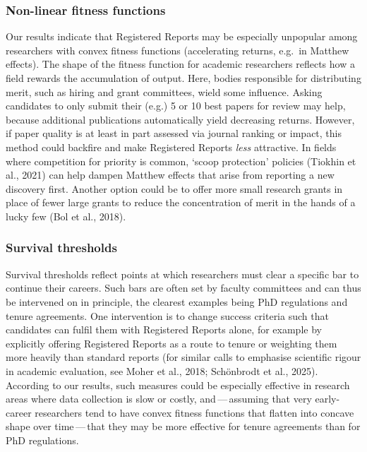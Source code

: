 \documentclass[
  british,
  a4paper,
  ,man,floatsintext]{apa6}
\begin{document}
\par\vspace{0.4\baselineskip}

\subsubsection{Non-linear fitness functions}\label{non-linear-fitness-functions-1}

Our results indicate that Registered Reports may be especially unpopular among researchers with convex fitness functions (accelerating returns, e.g.~in Matthew effects).
The shape of the fitness function for academic researchers reflects how a field rewards the accumulation of output.
Here, bodies responsible for distributing merit, such as hiring and grant committees, wield some influence.
Asking candidates to only submit their (e.g.) 5 or 10 best papers for review may help, because additional publications automatically yield decreasing returns.
However, if paper quality is at least in part assessed via journal ranking or impact, this method could backfire and make Registered Reports \emph{less} attractive.
In fields where competition for priority is common, `scoop protection' policies (Tiokhin et al., 2021) can help dampen Matthew effects that arise from reporting a new discovery first.
Another option could be to offer more small research grants in place of fewer large grants to reduce the concentration of merit in the hands of a lucky few (Bol et al., 2018).

\par\vspace{0.4\baselineskip}

\subsubsection{Survival thresholds}\label{survival-thresholds}

Survival thresholds reflect points at which researchers must clear a specific bar to continue their careers.
Such bars are often set by faculty committees and can thus be intervened on in principle, the clearest examples being PhD regulations and tenure agreements.
One intervention is to change success criteria such that candidates can fulfil them with Registered Reports alone, for example by explicitly offering Registered Reports as a route to tenure or weighting them more heavily than standard reports (for similar calls to emphasise scientific rigour in academic evaluation, see Moher et al., 2018; Schönbrodt et al., 2025). According to our results, such measures could be especially effective in research areas where data collection is slow or costly, and\(\,\)---\(\,\)assuming that very early-career researchers tend to have convex fitness functions that flatten into concave shape over time\(\,\)---\(\,\)that they may be more effective for tenure agreements than for PhD regulations.
\end{document}
